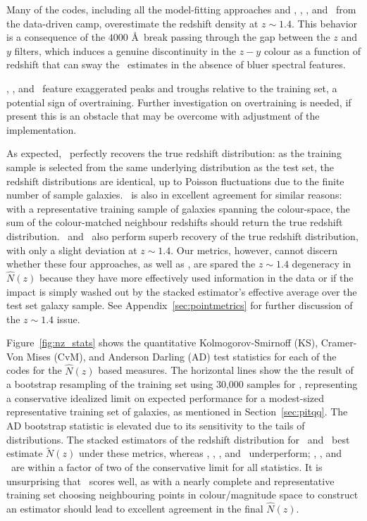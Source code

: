 Many of the codes, including all the model-fitting approaches and \annz, \gpz, \metaphor, and \skynet\ from the data-driven camp, overestimate the redshift density at $z \sim 1.4$.
This behavior is a consequence of the $4000$ \AA\ break passing through the gap between the $z$ and $y$ filters, which induces a genuine discontinuity in the $z - y$ colour as a function of redshift that can sway the \pzpdf\ estimates in the absence of bluer spectral features.

\annz, \gpz, and \metaphor\ feature exaggerated peaks and troughs relative to the training set, a potential sign of overtraining.
Further investigation on overtraining is needed, if present this is an obstacle that may be overcome with adjustment of the implementation.

As expected, \trainz\ perfectly recovers the true redshift distribution: as the training sample is selected from the same underlying distribution as the test set, the redshift distributions are identical, up to Poisson fluctuations due to the finite number of sample galaxies.
\cmnn\ is also in excellent agreement for similar reasons: with a representative training sample of galaxies spanning the colour-space, the sum of the colour-matched neighbour redshifts should return the true redshift distribution.
\flexzboost\ and \tpz\ also perform superb recovery of the true redshift distribution, with only a slight deviation at $z \sim 1.4$.
Our metrics, however, cannot discern whether these four approaches, as well as \delight, are spared the $z \sim 1.4$ degeneracy in $\hat{N}(z)$ because they have more effectively used information in the data or if the impact is simply washed out by the stacked estimator's effective average over the test set galaxy sample.
See Appendix~\ref{sec:pointmetrics} for further discussion of the $z \sim 1.4$ issue.

Figure~\ref{fig:nz_stats} shows the quantitative Kolmogorov-Smirnoff (KS), Cramer-Von Mises (CvM), and Anderson Darling (AD) test statistics for each of the codes for the $\hat{N}(z)$ based measures.
The horizontal lines show the the result of a bootstrap resampling of the training set using 30,000 samples for \trainz, representing a conservative idealized limit on expected performance for a modest-sized representative training set of galaxies, as mentioned in Section~\ref{sec:pitqq}.
The AD bootstrap statistic is elevated due to its sensitivity to the tails of distributions.
The stacked estimators of the redshift distribution for \cmnn\ and \trainz\ best estimate $\tilde{N}(z)$ under these metrics, whereas \eazy, \lephare, \metaphor, and \skynet\ underperform; \bpz, \gpz, and \tpz\ are within a factor of two of the conservative limit for all statistics.
It is unsurprising that \cmnn\ scores well, as with a nearly complete and representative training set choosing neighbouring points in colour/magnitude space to construct an estimator should lead to excellent agreement in the final $\hat{N}(z)$.


